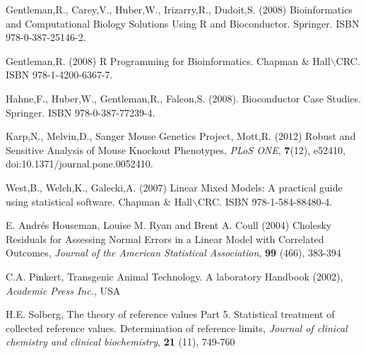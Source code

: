 \documentclass[12pt,a4paper]{article}
\begin{document}
\begin{thebibliography}{}

Gentleman,R., Carey,V., Huber,W., Irizarry,R., Dudoit,S.  (2008) Bioinformatics and Computational Biology Solutions Using R and Bioconductor. Springer.  ISBN 978-0-387-25146-2.

Gentleman,R. (2008) R Programming for Bioinformatics. Chapman \& Hall$\backslash$CRC. ISBN 978-1-4200-6367-7.

Hahne,F., Huber,W., Gentleman,R., Falcon,S. (2008). Bioconductor Case Studies. Springer.  ISBN 978-0-387-77239-4.

 Karp,N., Melvin,D., Sanger Mouse Genetics Project, Mott,R. (2012) Robust and Sensitive Analysis of Mouse Knockout Phenotypes, {\it PLoS ONE}, {\bf 7}(12), e52410, doi:10.1371/journal.pone.0052410.

  West,B., Welch,K., Galecki,A. (2007) Linear Mixed Models: A practical guide using statistical software. Chapman \& Hall$\backslash$CRC. ISBN 978-1-584-88480-4.

 E. Andrés Houseman, Louise M. Ryan and Brent A. Coull (2004) Cholesky Residuals for Assessing Normal Errors in a Linear Model with Correlated Outcomes, {\it Journal of the American Statistical Association}, {\bf 99} (466), 383-394

 C.A. Pinkert, Transgenic Animal Technology. A laboratory Handbook (2002), {\it Academic Press Inc.}, USA

 H.E. Solberg, The theory of reference values Part 5. Statistical treatment of collected reference values. Determination of reference limits, {\it Journal of clinical chemistry and clinical biochemistry}, {\bf 21} (11), 749-760


\end{thebibliography}
\end{document}
